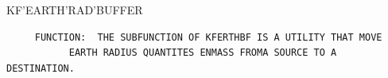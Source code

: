 \begin{frame}
KF'EARTH'RAD'BUFFER
\begin{verbatim}
     FUNCTION:  THE SUBFUNCTION OF KFERTHBF IS A UTILITY THAT MOVE
           EARTH RADIUS QUANTITES ENMASS FROMA SOURCE TO A DESTINATION.

\end{verbatim}
\end{frame}
